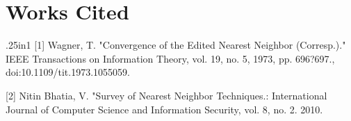 \documentclass{article}
\begin{document}
\section{Works Cited}
\begin{hangparas}{.25in}{1}
[1] Wagner, T. "Convergence of the Edited Nearest Neighbor (Corresp.)." IEEE Transactions on Information Theory, vol. 19, no. 5, 1973, pp. 696?697., doi:10.1109/tit.1973.1055059.

[2] Nitin Bhatia, V. "Survey of Nearest Neighbor Techniques.: International Journal of Computer Science and Information Security, vol. 8, no. 2. 2010.
\end{hangparas}
\end{document}
